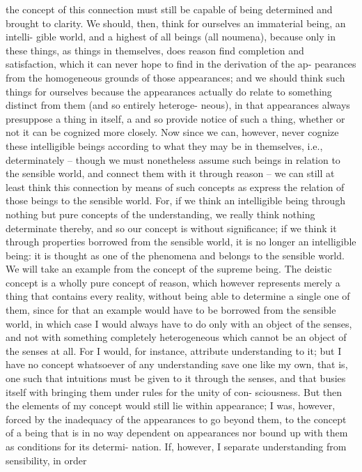 the concept of this connection must still be capable of being determined
and brought to clarity.
We should, then, think for ourselves an immaterial being, an intelli-
gible world, and a highest of all beings (all noumena), because only in
these things, as things in themselves, does reason ﬁnd completion and
satisfaction, which it can never hope to ﬁnd in the derivation of the ap-
pearances from the homogeneous grounds of those appearances; and we
should think such things for ourselves because the appearances actually
do relate to something distinct from them (and so entirely heteroge-
neous), in that appearances always presuppose a thing in itself, a and so
provide notice of such a thing, whether or not it can be cognized more
closely.
Now since we can, however, never cognize these intelligible beings
according to what they may be in themselves, i.e., determinately – though
we must nonetheless assume such beings in relation to the sensible world,
and connect them with it through reason – we can still at least think this
connection by means of such concepts as express the relation of those
beings to the sensible world. For, if we think an intelligible being through
nothing but pure concepts of the understanding, we really think nothing
determinate thereby, and so our concept is without signiﬁcance; if we
think it through properties borrowed from the sensible world, it is no
longer an intelligible being: it is thought as one of the phenomena and
belongs to the sensible world. We will take an example from the concept
of the supreme being.
The deistic concept is a wholly pure concept of reason, which however
represents merely a thing that contains every reality, without being able
to determine a single one of them, since for that an example would have
to be borrowed from the sensible world, in which case I would always
have to do only with an object of the senses, and not with something
completely heterogeneous which cannot be an object of the senses at
all. For I would, for instance, attribute understanding to it; but I have
no concept whatsoever of any understanding save one like my own, that
is, one such that intuitions must be given to it through the senses, and
that busies itself with bringing them under rules for the unity of con-
sciousness. But then the elements of my concept would still lie within
appearance; I was, however, forced by the inadequacy of the appearances
to go beyond them, to the concept of a being that is in no way dependent
on appearances nor bound up with them as conditions for its determi-
nation. If, however, I separate understanding from sensibility, in order
